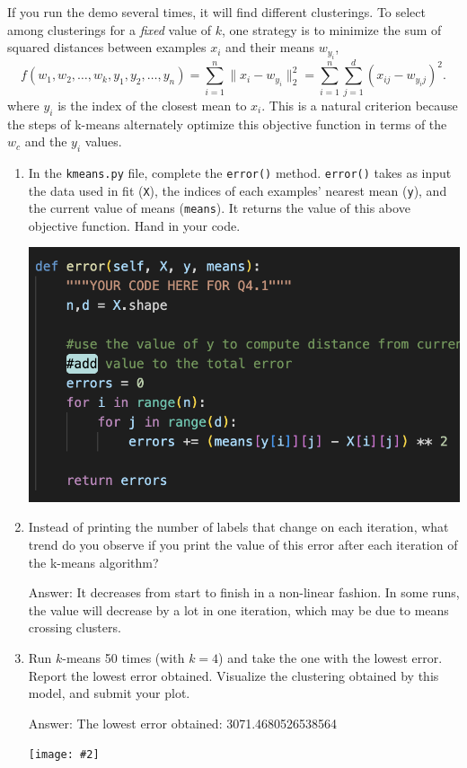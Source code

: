 \documentclass{article}
\def\ans#1{\par\gre{Answer: #1}}
\def\blu#1{{\color{blu}#1}}
\def\gre#1{{\color{gre}#1}}
\def\norm#1{\|#1\|}
\let\ask\blu
\newcommand{\centerfig}[2]{\begin{center}\texttt{[image: \#2]}\end{center}}
\def\enum#1{\begin{enumerate}#1\end{enumerate}}
\begin{document}
If you run the demo several times, it will find different clusterings. To select among clusterings for a \emph{fixed} value of $k$, one strategy is to minimize the sum of squared distances between examples $x_i$ and their means $w_{y_i}$,
\[
f(w_1,w_2,\dots,w_k,y_1,y_2,\dots,y_n) = \sum_{i=1}^n \norm{x_i - w_{y_i}}_2^2 = \sum_{i=1}^n \sum_{j=1}^d (x_{ij} - w_{y_ij})^2.
\]
 where $y_i$ is the index of the closest mean to $x_i$. This is a natural criterion because the steps of k-means alternately optimize this objective function in terms of the $w_c$ and the $y_i$ values.

 \blu{\enum{
 \item In the \texttt{kmeans.py} file, complete the \texttt{error()} method. \texttt{error()} takes as input the data used in fit (\texttt{X}), the indices of each examples' nearest mean (\texttt{y}), and the current value of means (\texttt{means}). It returns the value of this above objective function. Hand in your code.
 \begin{center}
     \includegraphics[width=400pt]{4.1.1.png}
 \end{center}
 \item Instead of printing the number of labels that change on each iteration, what trend do you observe if you print the value of this error after each iteration of the k-means algorithm?
 \ans{It decreases from start to finish in a non-linear fashion. In some runs, the value will decrease by a lot in one iteration, which may be due to means crossing clusters.} 
 \item Run $k$-means 50 times (with $k=4$) and take the one with the lowest error. \ask{Report the lowest error obtained.} Visualize the clustering obtained by this model, and \ask{submit your plot}.
 \ans{The lowest error obtained: 3071.4680526538564}
    \begin{center}
        \centerfig{.5}{figs/kmeans_lowest_error}
    \end{center}
 }}
\end{document}

